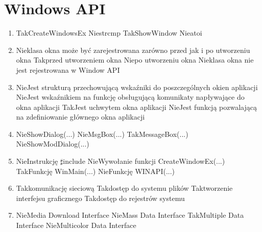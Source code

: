 

\newpage
\section{Windows API}

\begin{enumerate}
	
	\item {}
	{Tak}{CreateWindowsEx}
	{Nie}{strcmp}
	{Tak}{ShowWindow}
	{Nie}{atoi}
	
	\item {}
	{Nie}{klasa okna może być zarejestrowana zarówno przed jak i po utworzeniu okna}
	{Tak}{przed utworzeniem okna}
	{Nie}{po utworzeniu okna}
	{Nie}{klasa okna nie jest rejestrowana w Window API}
	
	\item {}
	{Nie}{Jest strukturą przechowującą wskaźniki do poszczególnych okien aplikacji}
	{Nie}{Jest wskaźnikiem na funkcję obsługującą komunikaty napływające do okna aplikacji}
	{Tak}{Jest uchwytem okna aplikacji}
	{Nie}{Jest funkcją pozwalającą na zdefiniowanie głównego okna aplikacji}
	
	\item {}
	{Nie}{ShowDialog(...)}
	{Nie}{MsgBox(...)}
	{Tak}{MessageBox(...)}
	{Nie}{ShowModDialog(...)}
	
	\item {}
	{Nie}{Instrukcję $\sharp$include}
	{Nie}{Wywołanie funkcji CreateWindowEx(...)}
	{Tak}{Funkcję WinMain(...)}
	{Nie}{Funkcję WINAPI(...)}
	
	\item {}
	{Tak}{komunikację sieciową}
	{Tak}{dostęp do systemu plików}
	{Tak}{tworzenie interfejsu graficznego}
	{Tak}{dostęp do rejestrów systemu}

	\item {}
	{Nie}{Media Download Interface}
	{Nie}{Mass Data Interface}
	{Tak}{Multiple Data Interface}
	{Nie}{Multicolor Data Interface}


\end{enumerate}
